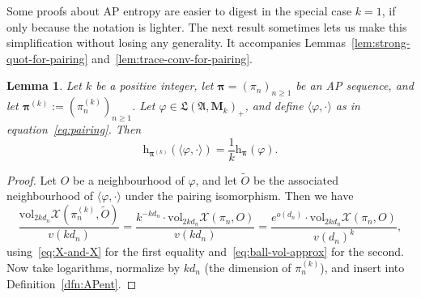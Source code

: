 \documentclass[12pt,a4paper]{article}
\numberwithin{equation}{section}
\newtheorem{lem}[thm]{Lemma}
\theoremstyle{remark}
\newcommand{\rmM}{\mathbf{M}}
\newcommand{\rmh}{\mathrm{h}}
\newcommand{\X}{\mathcal{X}}
\newcommand{\A}{\mathfrak{A}}
\newcommand{\frL}{\mathfrak{L}}
\renewcommand{\phi}{\varphi}
\renewcommand{\t}[1]{\widetilde{#1}}
\newcommand{\bspi}{\boldsymbol{\pi}}
\newcommand{\vol}{\mathrm{vol}}
\begin{document}
Some proofs about AP entropy are easier to digest in the special case $k=1$, if only because the notation is lighter.  The next result sometimes lets us make this simplification without losing any generality.  It accompanies Lemmas~\ref{lem:strong-quot-for-pairing} and~\ref{lem:trace-conv-for-pairing}.

\begin{lem}\label{lem:AP-for-pairing}
Let $k$ be a positive integer, let $\bspi = (\pi_n)_{n\ge 1}$ be an AP sequence, and let $\bspi^{(k)} := (\pi_n^{(k)})_{n\ge 1}$.  Let $\phi\in\frL(\A,\rmM_k)_+$, and define $\langle \phi,\cdot\rangle$ as in equation~\eqref{eq:pairing}.  Then
\[\rmh_{\bspi^{(k)}}(\langle \phi,\cdot\rangle) = \frac{1}{k} \rmh_{\bspi}(\phi).\]
\end{lem}

\begin{proof}
Let $O$ be a neighbourhood of $\phi$, and let $\t{O}$ be the associated neighbourhood of $\langle \phi,\cdot\rangle$ under the pairing isomorphism. Then we have
	\[\frac{\vol_{2kd_n}\X(\pi_n^{(k)},\t{O})}{v(kd_n)} = \frac{k^{-kd_n}\cdot\vol_{2kd_n}\X(\pi_n,O)}{v(kd_n)} = \frac{e^{o(d_n)}\cdot \vol_{2kd_n}\X(\pi_n,O)}{v(d_n)^k},\]
	using~\eqref{eq:X-and-X} for the first equality and~\eqref{eq:ball-vol-approx} for the second.  Now take logarithms, normalize by $kd_n$ (the dimension of $\pi_n^{(k)}$), and insert into Definition~\ref{dfn:APent}.
	\end{proof}
\end{document}
